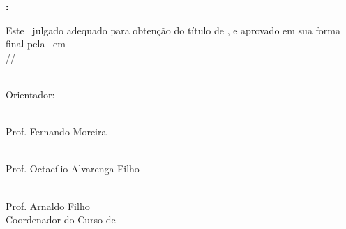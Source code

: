 \documentclass[main.tex]{subfiles}
\begin{document}
\begin{titlepage}

\begin{center}
    \large
    \MakeUppercase{\autores}
\end{center}

\vspace{0.5cm} 

\begin{center}
    \large
    \textbf{\MakeUppercase{\nomeprojeto}: \subtituloprojeto}
\end{center}

\vspace{2cm}

Este \tipotrabalho\ julgado adequado para obtenção do título de \curso, e aprovado em sua forma final pela \instituicao\ em
\\
\makebox[1cm]{\hrulefill}/\makebox[1cm]{\hrulefill}/\makebox[2cm]{\hrulefill}

\vfill %

\begin{flushright}
    \begin{minipage}[t]{1\textwidth} %
        \raggedleft

        \makebox[9.5cm]{\hrulefill}\\
        Orientador: \orientador
        \vspace{1cm}

        \makebox[9.5cm]{\hrulefill}\\
        Prof. Fernando Moreira
        \vspace{1cm}

        \makebox[9.5cm]{\hrulefill}\\
        Prof. Octacílio Alvarenga Filho
        \vspace{1cm}

        \makebox[9.5cm]{\hrulefill}\\
        Prof. Arnaldo Filho\\
        Coordenador do Curso de \curso
    \end{minipage}
\end{flushright}

\vfill

\begin{center}
    \large
    \MakeUppercase{\cidade}\\
    \ano
\end{center}

\end{titlepage}
\end{document}
